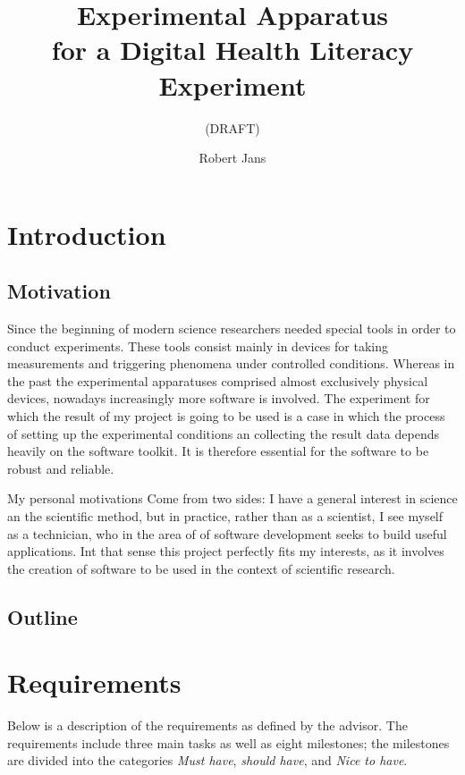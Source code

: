 \documentclass[]{usiinfbachelorproject}
\author{Robert Jans}
\title{Experimental Apparatus \\ for a Digital Health Literacy Experiment}
\subtitle{(DRAFT)}
\begin{document}
\maketitle

\section{Introduction} \label{introduction}

\subsection{Motivation}

Since the beginning of modern science researchers needed special tools in order to conduct experiments. These tools consist 
mainly in devices for taking measurements and triggering phenomena under controlled conditions. Whereas in the past the
experimental apparatuses comprised almost exclusively physical devices, nowadays increasingly more software is involved.
The experiment for which the result of my project is going to be used is a case in which the process of 
setting up the experimental conditions an collecting the result data depends heavily on the software toolkit. It is therefore
essential for the software to be robust and reliable.

My personal motivations Come from two sides: I have a general interest in science an the scientific method, but in practice,
rather than as a scientist,
I see myself as a technician, who in the area of of software development seeks to build useful applications.
Int that sense this project perfectly fits my interests, as it involves the creation of software to be used in the context of
scientific research.    

\subsection{Outline}
\TODO{}


\section{Requirements} \label{requirements}

Below is a description of the requirements as defined by the advisor. The requirements include three main tasks as well 
as eight milestones; the milestones are divided into the categories \emph{Must have}, \emph{should have}, and \emph{Nice to have}.
\end{document}

